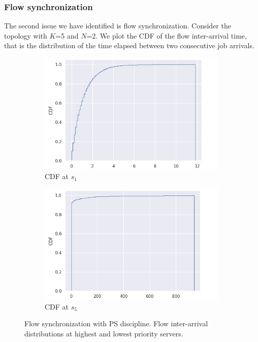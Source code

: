 \subsubsection{Flow synchronization}
The second issue we have identified is flow synchronization. Consider the topology with $K$=5 and $N$=2. We plot the CDF of the flow inter-arrival time, that is the distribution of the time elapsed between two consecutive job arrivals. 
\begin{figure}
	\centering
	\captionsetup{width=.75\linewidth}
	\begin{subfigure}{.5\textwidth}
		\centering
		\includegraphics[width=0.99\textwidth]{Chapter3/Figures/inter_arrival0_PS}
		\caption{CDF at $s_1$}
		\label{fig:iatimes-ps-s1}
	\end{subfigure}%
	\hfill
	\begin{subfigure}{.5\textwidth}
		\centering
		\includegraphics[width=0.99\textwidth]{Chapter3/Figures/inter_arrival4_PS}
		\caption{CDF at $s_5$}
		\label{fig:iatimes-ps-s5}
	\end{subfigure}%
	\caption{Flow synchronization with PS discipline. Flow inter-arrival distributions at highest and lowest priority servers.}
	\label{fig:iatimes-ps}
\end{figure}%
